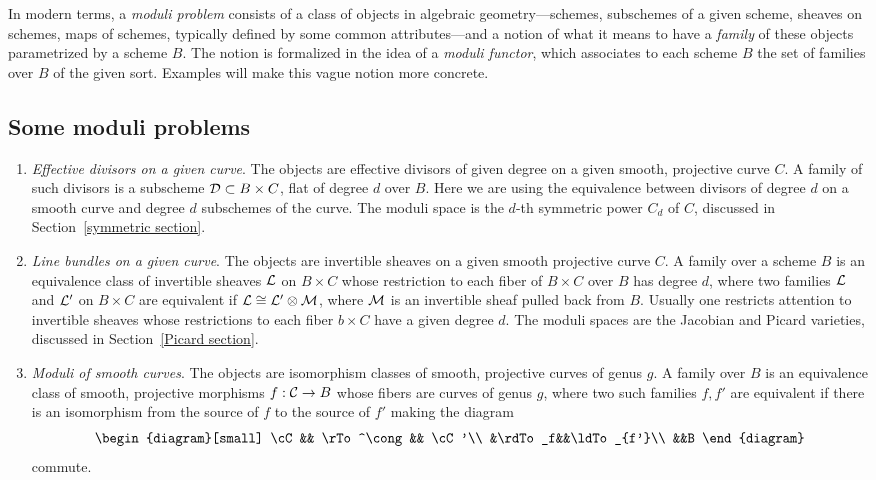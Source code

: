 In modern terms, a \emph{moduli problem} consists of a class of objects in algebraic geometry---schemes, subschemes of a given scheme, sheaves on schemes, maps of schemes, typically defined by some common attributes---and a notion of what it means to have a \emph{family} of these objects parametrized by a scheme $B$. The notion is formalized in the idea of a \emph{moduli functor}, 
which associates to each scheme $B$ the set of families over $B$ of the given sort. Examples will make this vague notion more concrete.

\subsection{Some moduli problems}

\begin{enumerate}\label{list of moduli problems}

\item \emph{Effective divisors on a given curve}. The objects are effective divisors of given degree on a given smooth, projective curve $C$. A family of such divisors is a subscheme ${\mathcal D} \subset B \times C$, flat of degree $d$ over $B$. 
Here we are using
the equivalence between divisors of degree $d$ on a smooth curve and degree $d$ subschemes of the curve. The moduli space is the $d$-th symmetric power $C_d$ of $C$, discussed in Section~\ref{symmetric section}.

\item \emph{Line bundles on a given curve}. The objects are invertible sheaves on a given smooth projective curve $C$. A family over a scheme $B$ is an equivalence class of invertible sheaves ${\mathcal L}$ on $B \times C$ whose restriction to each fiber of $B \times C$ over $B$ has degree $d$, where two families ${\mathcal L}$ and ${\mathcal L}'$ on $B \times C$ are equivalent if ${\mathcal L}\cong {\mathcal L}' \otimes {\mathcal M}$, where ${\mathcal M}$ is  an invertible sheaf pulled back from $B$. Usually one restricts attention to invertible sheaves 
whose restrictions to each fiber $b\times C$ have a given degree $d$.
The moduli spaces are the Jacobian and Picard varieties, discussed in Section~\ref{Picard section}.

\item \emph{Moduli of smooth curves}. The objects are isomorphism classes of smooth, projective curves of genus $g$. A family over $B$ is an equivalence class of smooth, projective morphisms $f : \mathcal C \to B$ whose fibers are curves of genus $g$, where two such families $f, f'$
are equivalent if there is an isomorphism from the source of $f$ to the source
of $f'$ making the diagram
$$
\begin{diagram}[small]
\cC && \rTo^\cong && \cC'\\
&\rdTo_f&&\ldTo_{f'}\\
&&B
\end{diagram}
$$
commute.


\end{enumerate}
